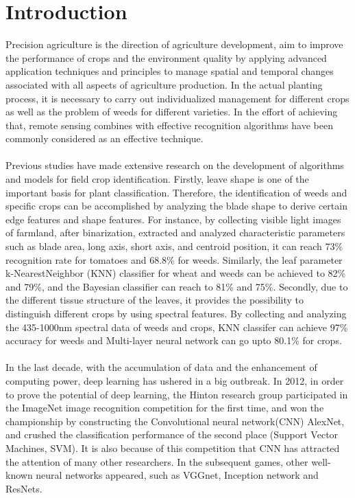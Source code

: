 \documentclass[11pt]{article}
\begin{document}
\section{Introduction}
Precision agriculture is the direction of agriculture development, aim to improve the performance of crops and the environment quality by applying advanced application techniques and principles to manage spatial and temporal changes associated with all aspects of agriculture production.\cite{Aspects of Precision Agriculture} In the actual planting process, it is necessary to carry out individualized management for different crops as well as the problem of weeds for different varieties. In the effort of achieving that, remote sensing combines with effective recognition algorithms have been commonly considered as an effective technique.
\\
\\
Previous studies have made extensive research on the development of algorithms and models for field crop identification. Firstly, leave shape is one of the important basis for plant classification. Therefore, the identification of weeds and specific crops can be accomplished by analyzing the blade shape to derive certain edge features and shape features. For instance, by collecting visible light images of farmland, after binarization, extracted and analyzed characteristic parameters such as blade area, long axis, short axis, and centroid position, it can reach 73\% recognition rate for tomatoes and 68.8\% for weeds\cite{Robotic Weed Control System for Tomatoes}. Similarly, the leaf parameter k-NearestNeighbor (KNN) classifier for wheat and weeds can be achieved to 82\% and 79\%, and the Bayesian classifier can reach to 81\% and 75\%\cite{Robotic Weed Control System for Tomatoes}. Secondly, due to the different tissue structure of the leaves, it provides the possibility to distinguish different crops by using spectral features. By collecting and analyzing the 435-1000nm spectral data of weeds and crops, KNN classifer can achieve 97\% accuracy for weeds and Multi-layer neural network can go upto 80.1\% for crops\cite{Robotic Weed Control System for Tomatoes}.
\\
\\
In the last decade, with the accumulation of data and the enhancement of computing power, deep learning has ushered in a big outbreak. In 2012, in order to prove the potential of deep learning, the Hinton research group participated in the ImageNet image recognition competition for the first time, and won the championship by constructing the Convolutional neural network(CNN) AlexNet, and crushed the classification performance of the second place (Support Vector Machines, SVM). It is also because of this competition that CNN has attracted the attention of many other researchers. In the subsequent games, other well-known neural networks appeared, such as VGGnet, Inception network and ResNets. 
\end{document}
